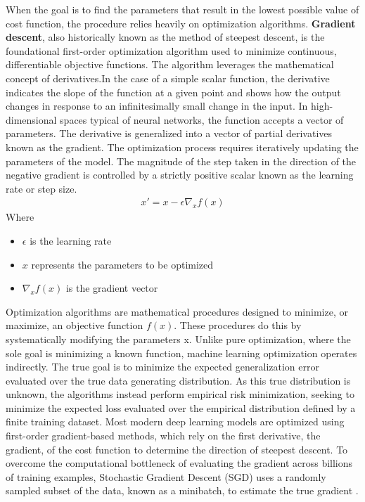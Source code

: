 When the goal is to find the parameters that result in the lowest possible value of cost function, the procedure relies heavily on optimization algorithms. \textbf{Gradient descent}, also historically known as the method of steepest descent, is the foundational first-order optimization algorithm used to minimize continuous, differentiable objective functions. The algorithm leverages the mathematical concept of derivatives.In the case of a simple scalar function, the derivative indicates the slope of the function at a given point and shows how the output changes in response to an infinitesimally small change in the input. In high-dimensional spaces typical of neural networks, the function accepts a vector of parameters. The derivative is generalized into a vector of partial derivatives known as the gradient.%
 The optimization process requires iteratively updating the parameters of the model. The magnitude of the step taken in the direction of the negative gradient is controlled by a strictly positive scalar known as the learning rate or step size.
\begin{align}
	x' = x - \epsilon \nabla_x f(x)
\end{align}
Where 
\begin{itemize}
	\item $\epsilon$ is the learning rate
	\item $x$ represents the parameters to be optimized
	\item $\nabla_xf(x)$ is the gradient vector 
\end{itemize}
Optimization algorithms are mathematical procedures designed to minimize, or maximize, an objective function $f(x)$. These procedures do this by systematically modifying the parameters x. Unlike pure optimization, where the sole goal is minimizing a known function, machine learning optimization operates indirectly. The true goal is to minimize the expected generalization error evaluated over the true data generating distribution. As this true distribution is unknown, the algorithms instead perform empirical risk minimization, seeking to minimize the expected loss evaluated over the empirical distribution defined by a finite training dataset.
Most modern deep learning models are optimized using first-order gradient-based methods, which rely on the first derivative, the gradient, of the cost function to determine the direction of steepest descent. To overcome the computational bottleneck of evaluating the gradient across billions of training examples, Stochastic Gradient Descent (SGD) uses a randomly sampled subset of the data, known as a minibatch, to estimate the true gradient \cite{Deep-Learning-book}.
